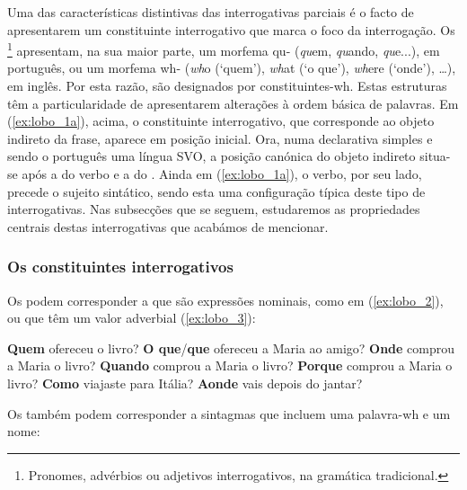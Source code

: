 \documentclass[output=paper]{LSP/langsci}
\begin{document}
Uma das características distintivas das interrogativas parciais é o facto de apresentarem um constituinte interrogativo que marca o foco da interrogação. Os \footnote{Pronomes, advérbios ou adjetivos interrogativos, na gramática tradicional.} apresentam, na sua maior parte, um morfema qu- (\textit{qu}em, \textit{qu}ando, \textit{qu}e...), em português, ou um morfema wh- (\textit{wh}o (‘quem’), \textit{wh}at (‘o que’), \textit{wh}ere (‘onde’), \ldots), em inglês. Por esta razão, são designados por cons\-ti\-tu\-in\-tes-wh. Estas estruturas têm a particularidade de apresentarem alterações à ordem básica de palavras. Em (\ref{ex:lobo_1a}), acima, o constituinte interrogativo, que corresponde ao objeto indireto da frase, aparece em posição inicial. Ora, numa declarativa simples e sendo o português uma língua SVO, a posição canónica do objeto indireto situa-se após a do verbo e a do . Ainda em (\ref{ex:lobo_1a}), o verbo, por seu lado, precede o sujeito sintático, sendo esta uma configuração típica deste tipo de interrogativas. Nas subsecções que se seguem, estudaremos as propriedades centrais destas interrogativas que acabámos de mencionar.

\subsubsection{Os constituintes interrogativos}
\label{subsubsec:lobo_constituintes_int}

Os  podem corresponder a  que são expressões nominais, como em (\ref{ex:lobo_2}), ou que têm um valor adverbial (\ref{ex:lobo_3}):

\ea\label{ex:lobo_2}
\ea\label{ex:lobo_2a} \textbf{Quem} ofereceu o livro?
\ex\label{ex:lobo_2b} \textbf{O que}/\textbf{que}{\footnotemark} ofereceu a Maria ao amigo?
\zl
\largerpage
\ea\label{ex:lobo_3}
\ea\label{ex:lobo_3a} \textbf{Onde} comprou a Maria o livro?
\ex\label{ex:lobo_3b} \textbf{Quando} comprou a Maria o livro?
\ex\label{ex:lobo_3c} \textbf{Porque} comprou a Maria o livro?
\ex\label{ex:lobo_3d} \textbf{Como} viajaste para Itália?
\ex\label{ex:lobo_3e} \textbf{Aonde} vais depois do jantar?
\zl

Os  também podem corresponder a sintagmas que incluem uma palavra-wh e um nome:
\end{document}
